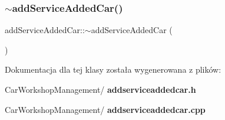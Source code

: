 \mbox{\label{classadd_service_added_car_af18bcfeee6994e430dab9cbb12365fb7}} 
\subsubsection{$\sim$addServiceAddedCar()}
{\footnotesize\ttfamily add\+Service\+Added\+Car\+::$\sim$add\+Service\+Added\+Car (\begin{DoxyParamCaption}{ }\end{DoxyParamCaption})}



Dokumentacja dla tej klasy została wygenerowana z plików\+:\begin{DoxyCompactItemize}
\item 
Car\+Workshop\+Management/\textbf{ addserviceaddedcar.\+h}\item 
Car\+Workshop\+Management/\textbf{ addserviceaddedcar.\+cpp}\end{DoxyCompactItemize}

